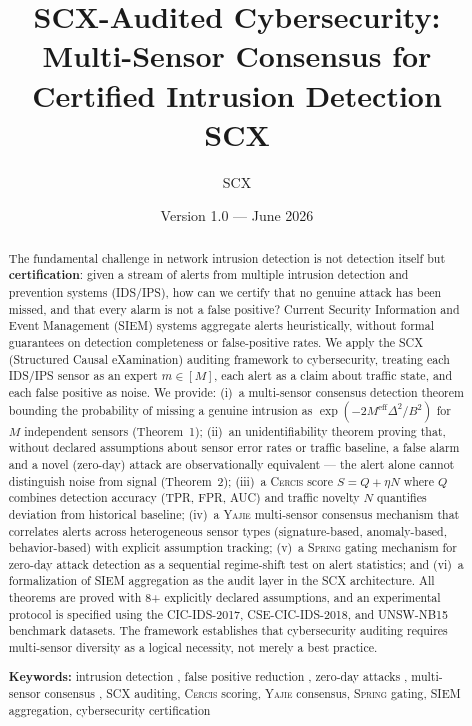 \documentclass[11pt,a4paper]{article}
\title{\textbf{SCX-Audited Cybersecurity:}\\
\large Multi-Sensor Consensus for Certified Intrusion Detection\\
\medskip
\normalsize\textbf{SCX}}
\author{SCX}
\date{Version 1.0 --- June 2026}
\theoremstyle{definition}
\theoremstyle{remark}
\newcommand{\SCX}{\textsc{SCX}}
\newcommand{\Yajie}{\textsc{Yajie}}
\newcommand{\Cercis}{\textsc{Cercis}}
\newcommand{\Spring}{\textsc{Spring}}
\begin{document}
\maketitle

\begin{abstract}
The fundamental challenge in network intrusion detection is not detection itself but \textbf{certification}: given a stream of alerts from multiple intrusion detection and prevention systems (IDS/IPS), how can we certify that no genuine attack has been missed, and that every alarm is not a false positive? Current Security Information and Event Management (SIEM) systems aggregate alerts heuristically, without formal guarantees on detection completeness or false-positive rates. We apply the \SCX{} (Structured Causal eXamination) auditing framework to cybersecurity, treating each IDS/IPS sensor as an expert $m \in [M]$, each alert as a claim about traffic state, and each false positive as noise. We provide: (i)~a multi-sensor consensus detection theorem bounding the probability of missing a genuine intrusion as $\exp(-2 M^{\mathrm{eff}} \Delta^2 / B^2)$ for $M$ independent sensors (Theorem~1); (ii)~an unidentifiability theorem proving that, without declared assumptions about sensor error rates or traffic baseline, a false alarm and a novel (zero-day) attack are observationally equivalent — the alert alone cannot distinguish noise from signal (Theorem~2); (iii)~a \Cercis{} score $S = Q + \eta N$ where $Q$ combines detection accuracy (TPR, FPR, AUC) and traffic novelty $N$ quantifies deviation from historical baseline; (iv)~a \Yajie{} multi-sensor consensus mechanism that correlates alerts across heterogeneous sensor types (signature-based, anomaly-based, behavior-based) with explicit assumption tracking; (v)~a \Spring{} gating mechanism for zero-day attack detection as a sequential regime-shift test on alert statistics; and (vi)~a formalization of SIEM aggregation as the audit layer in the SCX architecture. All theorems are proved with 8+ explicitly declared assumptions, and an experimental protocol is specified using the CIC-IDS-2017, CSE-CIC-IDS-2018, and UNSW-NB15 benchmark datasets. The framework establishes that cybersecurity auditing requires multi-sensor diversity as a logical necessity, not merely a best practice.

\medskip
\noindent\textbf{Keywords:} intrusion detection , false positive reduction , zero-day attacks , multi-sensor consensus , SCX auditing, \Cercis{} scoring, \Yajie{} consensus, \Spring{} gating, SIEM aggregation, cybersecurity certification 
\end{abstract}
\end{document}
